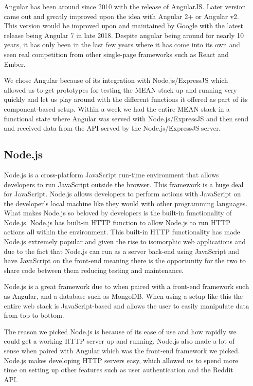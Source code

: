 Angular has been around since 2010 with the release of AngularJS. Later version came out and greatly improved upon the idea with Angular 2+ or Angular v2. This version would be improved upon and maintained by Google with the latest release being Angular 7 in late 2018. Despite angular being around for nearly 10 years, it has only been in the last few years where it has come into its own and seen real competition from other single-page frameworks such as React and Ember.

We chose Angular because of its integration with Node.js/ExpressJS which allowed us to get prototypes for testing the MEAN stack up and running very quickly and let us play around with the different functions it offered as part of its component-based setup. Within a week we had the entire MEAN stack in a functional state where Angular was served with Node.js/ExpressJS and then send and received data from the API served by the Node.js/ExpressJS server. 

\subsection{Node.js}
Node.js is a cross-platform JavaScript run-time environment that allows developers to run JavaScript outside the browser. This framework is a huge deal for JavaScript. Node.js allows developers to perform actions with JavaScript on the developer's local machine like they would with other programming languages. What makes Node.js so beloved by developers is the built-in functionality of Node.js. Node.js has built-in HTTP function to allow Node.js to run HTTP actions all within the environment. This built-in HTTP functionality has made Node.js extremely popular and given the rise to isomorphic web applications and due to the fact that Node.js can run as a server back-end using JavaScript and have JavaScript on the front-end meaning there is the opportunity for the two to share code between them reducing testing and maintenance. \cite{67301420130101}

Node.js is a great framework due to when paired with a front-end framework such as Angular, and a database such as MongoDB. When using a setup like this the entire web stack is JavaScript-based and allows the user to easily manipulate data from top to bottom.

The reason we picked Node.js is because of its ease of use and how rapidly we could get a working HTTP server up and running. Node.js also made a lot of sense when paired with Angular which was the front-end framework we picked. Node.js makes developing HTTP servers easy, which allowed us to spend more time on setting up other features such as user authentication and the Reddit API. 

